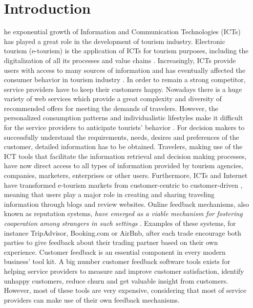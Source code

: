 %
%
\let\textcircled=\pgftextcircled
\chapter{Introduction}
\label{chap:intro}
%
%

he exponential growth of Information and Communication Technologies (ICTs) has played a great role in the development of tourism industry. Electronic tourism (e-tourism) is the application of ICTs for tourism purposes, including the digitalization of all its processes and value chains \cite{buhalis2003etourism}. Increasingly, ICTs provide users with access to many sources of information and has eventually affected the consumer behavior in tourism industry \cite{mills2004handbook}. In order to remain a strong competitor, service providers have to keep their customers happy. Nowadays there is a huge variety of web services which provide a great complexity and diversity of recommended offers for meeting the demands of travelers. However, the personalized consumption patterns and individualistic lifestyles make it difficult for the service providers to anticipate tourists' behavior \cite{niemann2008enhancing}. For decision makers to successfully understand the requirements, needs, desires and preferences of the customer, detailed information has to be obtained. Travelers, making use of the ICT tools that facilitate the information retrieval and decision making processes, have now direct access to all types of information provided by tourism agencies, companies, marketers, enterprises or other users. Furthermore, ICTs and Internet have transformed e-tourism markets from customer-centric to customer-driven \cite{buhalis2011tourism}, meaning that users play a major role in creating and sharing traveling information through blogs and review websites. Online feedback mechanisms, also known as reputation systems, \textit{have emerged as a viable mechanism for fostering cooperation among strangers in such settings} \cite{dellarocas2003digitization}. Examples of these systems, for instance TripAdvisor, Booking.com or AirBnb, after each trade encourage both parties to give feedback about their trading partner based on their own experience. 
Customer feedback is an essential component in every modern business' tool kit. A big number customer feedback software tools exists for helping service providers to measure and improve customer satisfaction, identify unhappy customers, reduce churn and get valuable insight from customers. However, most of these tools are very expensive, considering that most of service providers can make use of their own feedback mechanisms.
%
